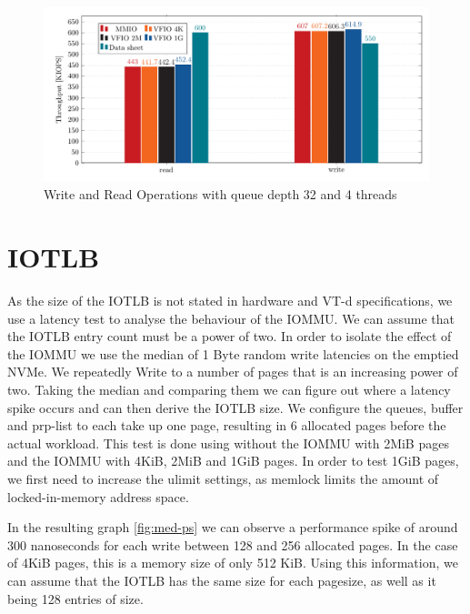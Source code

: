\begin{figure}
    \centering
    \includegraphics[width=\textwidth]{figures/throughputqd32t1singlepage}
    \caption{Write and Read Operations with queue depth 32 and 4 threads}
    \label{fig:iopsq32t1sp}
\end{figure}

\section{IOTLB}
As the size of the IOTLB is not stated in hardware and VT-d specifications, we use a latency test to analyse the behaviour of the IOMMU. We can assume that the IOTLB entry count must be a power of two. In order to isolate the effect of the IOMMU we use the median of 1 Byte random write latencies on the emptied NVMe. We repeatedly Write to a number of pages that is an increasing power of two. Taking the median and comparing them we can figure out where a latency spike occurs and can then derive the IOTLB size. We configure the queues, buffer and prp-list to each take up one page, resulting in 6 allocated pages before the actual workload. This test is done using without the IOMMU with 2MiB pages and the IOMMU with 4KiB, 2MiB and 1GiB pages. In order to test 1GiB pages, we first need to increase the ulimit settings, as memlock limits the amount of locked-in-memory address space.

In the resulting graph \autoref{fig:med-ps} we can observe a performance spike of around 300 nanoseconds for each write between 128 and 256 allocated pages. In the case of 4KiB pages, this is a memory size of only 512 KiB. Using this information, we can assume that the IOTLB has the same size for each pagesize, as well as it being 128 entries of size.

